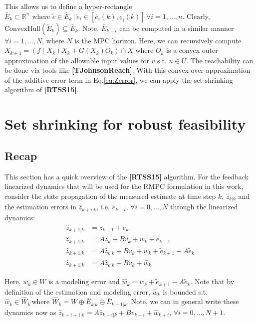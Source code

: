 \documentclass{article}[14pt]
\begin{document}
This allows us to define a hyper-rectangle $\bar{E}_k\subset\mathbb{R}^n \text{ where } \tilde{e} \in \bar{E}_k \,|\, \tilde{e}_i \in [\overline{{e}}_i(k),\underline{{e}}_i(k)]\,\forall i=1,\dotsc,n$. 
Clearly, $\text{ConvexHull}(\tilde{E}_k) \subseteq \bar{E}_k$. Note, $\bar{E}_{k+i}$ can be computed in a similar manner $\forall i=1,\dotsc,N$, where $N$ is the MPC horizon. Here, we can recursively compute $X_{k+1}=(f(X_k)X_k+G(X_k)O_k)\cap X$ where $O_k$ is a convex outer approximation of the allowable input values for $v$ s.t. $u\in U$. The reachability can be done via tools like \textbf{[TJohnsonReach]}.
With this convex over-approximation of the additive error term in Eq.\ref{eq:Zerror}, we can apply the set shrinking algorithm of \textbf{[RTSS15]}.

\section{Set shrinking for robust feasibility}

\subsection{Recap}
\label{sec:Recap}
This section has a quick overview of the \textbf{[RTSS15]} algorithm. For the feedback linearized dynamics that will be used for the RMPC formulation in this work, consider the state propagation of the measured estimate at time step $k$, $\hat{z}_{k|k}$ and the estimation errors in $\hat{z}_{k+i|k}$, i.e. $\tilde{e}_{k+i},\,\forall i=0,\dotsc,N$ through the linearized dynamics:
\begin{subequations}
\begin{align}
\hat{z}_{k+1|k}&=z_{k+1}+\tilde{e}_k \\
\hat{z}_{k+1|k}&=A{z}_{k}+Bv_k+w_k+\tilde{e}_{k+1} \\
\hat{z}_{k+1|k}&=A\hat{z}_{k|k}+Bv_k+w_k+\tilde{e}_{k+1}-A\tilde{e}_k \\
\hat{z}_{k+1|k}&=A\hat{z}_{k|k}+Bv_k+\hat{w}_k
\end{align}
\end{subequations}

Here, $w_k\in W$ is a modeling error and $\hat{w}_k=w_k+\tilde{e}_{k+1}-A\tilde{e}_k$. Note that by definition of the estimation and modeling error, $\hat{w}_k$ is bounded s.t. $\hat{w}_k\in\hat{W}_k\,\text{where }\hat{W}_k=W\oplus\bar{E}_{k|k}\oplus\bar{E}_{k+1|k}$. Note, we can in general write these dynamics now as $\hat{z}_{k+i+1|k}=A\hat{z}_{k+i|k}+Bv_{k+i}+\hat{w}_{k+i},\,\forall i=0,\dotsc,N+1$. 
\end{document}
